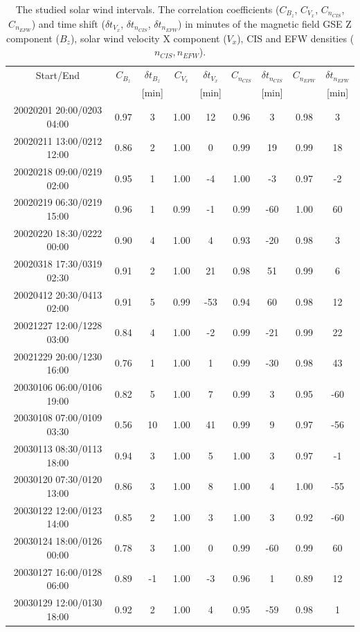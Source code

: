 \documentclass[draft]{agujournal2019}
\begin{document}
\begin{table}[h]
\setlength{\tabcolsep}{3pt}
\caption{The studied solar wind intervals. The correlation coefficients ($C_{B_{z}}$, $C_{V_{x}}$, $C_{n_{CIS}}$, $C_{n_{EFW}}$) and time shift ($\delta t_{V_{x}}$, $\delta t_{n_{CIS}}$, $\delta t_{n_{EFW}}$) in minutes of the magnetic field GSE Z component ($B_z$), solar wind velocity X component ($V_x$), CIS and EFW densities ($n_{CIS}, n_{EFW}$).\label{tab:sw}}
\centering
\begin{tabular}{c||cc|cc|cc|cc}
\hline
Start/End & $C_{B_{z}}$ & $\delta t_{B_{z}}$ & $C_{V_{x}}$ & $\delta t_{V_{x}}$ & $C_{n_{CIS}}$ & $\delta t_{n_{CIS}}$ & $C_{n_{EFW}}$ & $\delta t_{n_{EFW}}$ \\
& & [min] & & [min] & & [min] & & [min] \\
\hline
20020201 20:00/0203 04:00 & 0.97 & 3 & 1.00 & 12 & 0.96 & 3 & 0.98 & 3 \\
20020211 13:00/0212 12:00 & 0.86 & 2 & 1.00 & 0 & 0.99 & 19 & 0.99 & 18 \\
20020218 09:00/0219 02:00 & 0.95 & 1 & 1.00 & -4 & 1.00 & -3 & 0.97 & -2 \\
20020219 06:30/0219 15:00 & 0.96 & 1 & 0.99 & -1 & 0.99 & -60 & 1.00 & 60 \\
20020220 18:30/0222 00:00 & 0.90 & 4 & 1.00 & 4 & 0.93 & -20 & 0.98 & 3 \\
20020318 17:30/0319 02:30 & 0.91 & 2 & 1.00 & 21 & 0.98 & 51 & 0.99 & 6 \\
20020412 20:30/0413 02:00 & 0.91 & 5 & 0.99 & -53 & 0.94 & 60 & 0.98 & 12 \\
20021227 12:00/1228 03:00 & 0.84 & 4 & 1.00 & -2 & 0.99 & -21 & 0.99 & 22 \\
20021229 20:00/1230 16:00 & 0.76 & 1 & 1.00 & 1 & 0.99 & -30 & 0.98 & 43 \\
20030106 06:00/0106 19:00 & 0.82 & 5 & 1.00 & 7 & 0.99 & 3 & 0.95 & -60 \\
20030108 07:00/0109 03:30 & 0.56 & 10 & 1.00 & 41 & 0.99 & 9 & 0.97 & -56 \\
20030113 08:30/0113 18:00 & 0.94 & 3 & 1.00 & 5 & 1.00 & 3 & 0.97 & -1 \\
20030120 07:30/0120 13:00 & 0.86 & 3 & 1.00 & 8 & 1.00 & 4 & 1.00 & -55 \\
20030122 12:00/0123 14:00 & 0.85 & 2 & 1.00 & 3 & 1.00 & 3 & 0.92 & -60 \\
20030124 18:00/0126 00:00 & 0.78 & 3 & 1.00 & 0 & 0.99 & -60 & 0.99 & 60 \\
20030127 16:00/0128 06:00 & 0.89 & -1 & 1.00 & -3 & 0.96 & 1 & 0.89 & 12 \\
20030129 12:00/0130 18:00 & 0.92 & 2 & 1.00 & 4 & 0.95 & -59 & 0.98 & 1 \\
\hline
\end{tabular}
\end{table}
\end{document}
